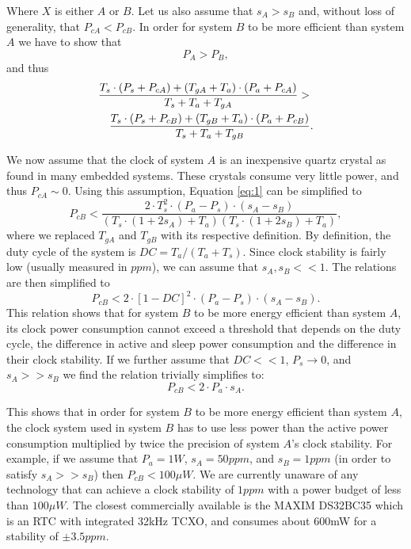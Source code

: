 Where $X$ is either $A$ or $B$. Let us also assume that $s_A > s_B$ and, without loss 
of generality, that $P_{cA} < P_{cB}$. In order for system $B$ to be more efficient 
than system $A$ we have to show that
\begin{equation}
	P_A > P_B,
\end{equation}
and thus
\begin{eqnarray}
	\lefteqn{\frac{T_s \cdot (P_s + P_{cA}) + (T_{gA} + T_a) \cdot (P_a + P_{cA})}{T_s + T_a + T_{gA}}  > } \nonumber \\
	& & \frac{T_s \cdot (P_s + P_{cB}) + (T_{gB} + T_a) \cdot (P_a +
	P_{cB})}{T_s + T_a + T_{gB}}.\label{eq:1}
\end{eqnarray}

We now assume that the clock of system $A$ is an inexpensive quartz crystal as
found in many embedded systems. These crystals consume very little power, and thus
$P_{cA} \sim 0$. Using this assumption, Equation \ref{eq:1} can be simplified to
\begin{equation}
P_{cB} < \frac{2\cdot T_s^2\cdot(P_a-P_s)\cdot(s_A-s_B)}{(T_s\cdot(1+2s_A)+T_a)(T_s\cdot(1+2s_B)+T_a)},
	\label{eq:2}
\end{equation}
where we replaced $T_{gA}$ and $T_{gB}$ with its respective definition. By definition, 
the duty cycle of the system is $DC=T_a/(T_a + T_s)$. Since clock stability is fairly low 
(usually measured in $ppm$), we can assume that $s_A, s_B << 1$. The relations are then 
simplified to
\begin{equation}
	P_{cB} < 2 \cdot [1-DC]^2\cdot (P_a-P_s) \cdot (s_A-s_B).
\end{equation}
This relation shows that for system $B$ to be more energy efficient than system $A$, 
its clock power consumption cannot exceed a threshold that depends on the duty cycle, 
the difference in active and sleep power consumption and the difference in their
clock stability. 
If we further assume that $DC << 1$, $P_s \rightarrow 0$, and $s_A >> s_B$ we find the 
relation trivially simplifies to:
\begin{equation}
	P_{cB} < 2 \cdot P_a \cdot s_A.
\end{equation}

This shows that in order for system $B$ to be more energy efficient than system
$A$, the clock system used in system $B$ has to use less power than the active
power consumption multiplied by twice the precision of system $A$'s clock
stability. For example, if we assume that $P_a=1W$, $s_A=50 ppm$, and $s_B=1
ppm$ (in order to satisfy $s_A >> s_B$) then $P_{cB} < 100 \mu W$. We
are currently unaware of any technology that can achieve a clock stability of
$1ppm$ with a power budget of less than $100 \mu W$. The closest commercially
available is the MAXIM DS32BC35 \cite{maxim2008ds32b35} which is
an RTC with integrated 32kHz TCXO, and consumes about 600mW for a stability of
$\pm 3.5ppm$. 


